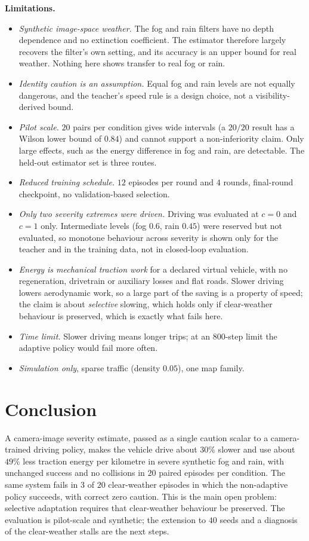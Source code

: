 \documentclass[conference]{IEEEtran}
\begin{document}
\textbf{Limitations.}
\begin{itemize}
\item \emph{Synthetic image-space weather.} The fog and rain filters have no depth dependence and no extinction coefficient. The estimator therefore largely recovers the filter's own setting, and its accuracy is an upper bound for real weather. Nothing here shows transfer to real fog or rain.
\item \emph{Identity caution is an assumption.} Equal fog and rain levels are not equally dangerous, and the teacher's speed rule is a design choice, not a visibility-derived bound.
\item \emph{Pilot scale.} $20$ pairs per condition gives wide intervals (a $20/20$ result has a Wilson lower bound of $0.84$) and cannot support a non-inferiority claim. Only large effects, such as the energy difference in fog and rain, are detectable. The held-out estimator set is three routes.
\item \emph{Reduced training schedule.} $12$ episodes per round and $4$ rounds, final-round checkpoint, no validation-based selection.
\item \emph{Only two severity extremes were driven.} Driving was evaluated at $c=0$ and $c=1$ only. Intermediate levels (fog $0.6$, rain $0.45$) were reserved but not evaluated, so monotone behaviour across severity is shown only for the teacher and in the training data, not in closed-loop evaluation.
\item \emph{Energy is mechanical traction work} for a declared virtual vehicle, with no regeneration, drivetrain or auxiliary losses and flat roads. Slower driving lowers aerodynamic work, so a large part of the saving is a property of speed; the claim is about \emph{selective} slowing, which holds only if clear-weather behaviour is preserved, which is exactly what fails here.
\item \emph{Time limit.} Slower driving means longer trips; at an $800$-step limit the adaptive policy would fail more often.
\item \emph{Simulation only}, sparse traffic (density $0.05$), one map family.
\end{itemize}

\section{Conclusion}
A camera-image severity estimate, passed as a single caution scalar to a camera-trained driving policy, makes the vehicle drive about $30\%$ slower and use about $49\%$ less traction energy per kilometre in severe synthetic fog and rain, with unchanged success and no collisions in $20$ paired episodes per condition. The same system fails in $3$ of $20$ clear-weather episodes in which the non-adaptive policy succeeds, with correct zero caution. This is the main open problem: selective adaptation requires that clear-weather behaviour be preserved. The evaluation is pilot-scale and synthetic; the extension to $40$ seeds and a diagnosis of the clear-weather stalls are the next steps.
\end{document}
